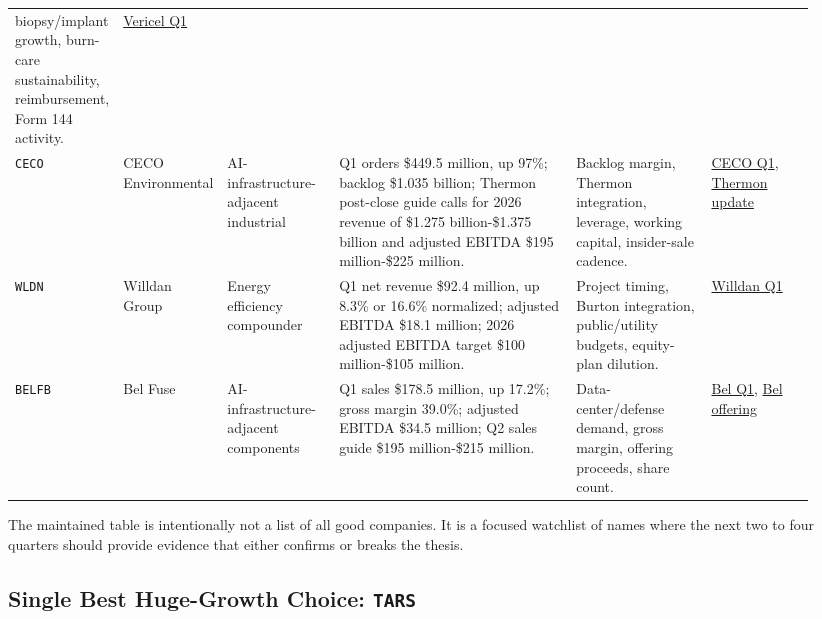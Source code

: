 \documentclass[
  9pt,
]{article}
\begin{document}
\begin{longtable}[]{@{}L{0.07\linewidth}L{0.12\linewidth}L{0.14\linewidth}L{0.30\linewidth}L{0.17\linewidth}L{0.13\linewidth}@{}}
biopsy/implant growth, burn-care sustainability, reimbursement, Form 144
activity. &
\href{https://investors.vcel.com/news-releases/news-release-details/vericel-reports-first-quarter-2026-financial-results-and-raises}{Vericel
Q1} \\
\texttt{CECO} & CECO Environmental & AI-infrastructure-adjacent
industrial & Q1 orders \$449.5 million, up 97\%; backlog \$1.035
billion; Thermon post-close guide calls for 2026 revenue of \$1.275
billion-\$1.375 billion and adjusted EBITDA \$195 million-\$225 million.
& Backlog margin, Thermon integration, leverage, working capital,
insider-sale cadence. &
\href{https://www.globenewswire.com/news-release/2026/04/28/3282406/0/en/ceco-environmental-reports-first-quarter-2026-results.html}{CECO
Q1},
\href{https://www.globenewswire.com/news-release/2026/06/09/3308707/0/en/ceco-environmental-provides-post-closing-update-on-thermon-transaction.html}{Thermon
update} \\
\texttt{WLDN} & Willdan Group & Energy efficiency compounder & Q1 net
revenue \$92.4 million, up 8.3\% or 16.6\% normalized; adjusted EBITDA
\$18.1 million; 2026 adjusted EBITDA target \$100 million-\$105 million.
& Project timing, Burton integration, public/utility budgets,
equity-plan dilution. &
\href{https://ir.willdangroup.com/news-releases/news-release-details/willdan-group-reports-first-quarter-results-2}{Willdan
Q1} \\
\texttt{BELFB} & Bel Fuse & AI-infrastructure-adjacent components & Q1
sales \$178.5 million, up 17.2\%; gross margin 39.0\%; adjusted EBITDA
\$34.5 million; Q2 sales guide \$195 million-\$215 million. &
Data-center/defense demand, gross margin, offering proceeds, share
count. &
\href{https://ir.belfuse.com/news-releases/news-release-details/bel-reports-first-quarter-2026-results}{Bel
Q1},
\href{https://ir.belfuse.com/news-releases/news-release-details/bel-fuse-inc-announces-pricing-upsized-public-offering-class-b}{Bel
offering} \\
\bottomrule
\end{longtable}
\normalsize

The maintained table is intentionally not a list of all good companies.
It is a focused watchlist of names where the next two to four quarters
should provide evidence that either confirms or breaks the thesis.

\hypertarget{single-best-huge-growth-choice-tars}{%
\subsection{\texorpdfstring{Single Best Huge-Growth Choice:
\texttt{TARS}}{Single Best Huge-Growth Choice: TARS}}\label{single-best-huge-growth-choice-tars}}
\end{document}
